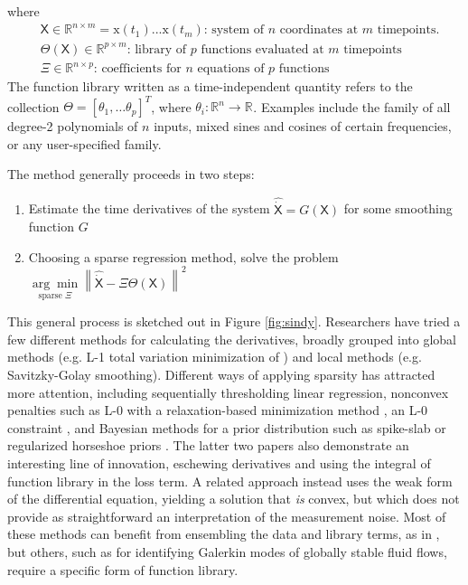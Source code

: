 \documentclass{ACCESS_latex_template_20231118/ieeeaccess}
\newcommand{\mat}[1]{\boldsymbol{\mathsf{#1}}}
\renewcommand{\vec}[1]{\boldsymbol{\mathrm{#1}}}
\newcommand{\R}[1]{\mathbb{R}^{#1}}
\begin{document}
where
\begin{align*}
    &\mat X \in \R{n \times m}=\vec x(t_1)... \vec x(t_m)\text{: system of $n$ coordinates at $m$ timepoints.}\\
    &\mat \Theta({\mat X}) \in \R{p \times m}\text{: library of $p$ functions evaluated at $m$ timepoints}\\
    &\mat \Xi \in \R{n \times p}\text{: coefficients for $n$ equations of $p$ functions}
\end{align*}
The function library written as a time-independent quantity refers to the collection $\mat \Theta = [\theta_1, \dots \theta_p]^T$, where $\theta_i: \R{n}\rightarrow\R{}$. Examples include the family of all degree-2 polynomials of $n$ inputs, mixed sines and cosines of certain frequencies, or any user-specified family.

The method generally proceeds in two steps:

\begin{enumerate}
    \item Estimate the time derivatives of the system ${\mat{\widehat{\dot X}}} = G(\mat X)$ for some smoothing function $G$
    \item Choosing a sparse regression method, solve the problem $\underset{\text{sparse } \mat \Xi}{\arg\min} \left\| \mat{\widehat{\dot{X}}} - \mat \Xi \mat \Theta(\mat X) \right\|^2$
\end{enumerate}
This general process is sketched out in Figure \ref{fig:sindy}.  Researchers have tried a few different methods for calculating the derivatives, broadly grouped into  global methods (e.g. L-1 total variation minimization of \cite{Chartrand2011}) and local methods (e.g. Savitzky-Golay smoothing).  Different ways of applying sparsity has attracted more attention, including sequentially thresholding linear regression, nonconvex penalties such as L-0 with a relaxation-based minimization method \citep{zheng2018unified,Champion2020}, an L-0 constraint \citep{Bertsimas2023}, and Bayesian methods for a prior distribution such as spike-slab or regularized horseshoe priors \citep{Hirsh2022,gao2022bayesian}.  The latter two papers also demonstrate an interesting line of innovation, eschewing derivatives and using the integral of function library in the loss term.  A related approach instead uses the weak form of the differential equation, yielding a solution that {\it is} convex, but which does not provide as straightforward an interpretation of the measurement noise. Most of these methods can benefit from ensembling the data and library terms, as in \cite{Fasel2022}, but others, such as \cite{Kaptanoglu2021} for identifying Galerkin modes of globally stable fluid flows, require a specific form of function library.
\end{document}
